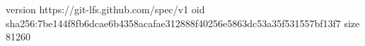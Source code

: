 version https://git-lfs.github.com/spec/v1
oid sha256:7be144f8fb6dcae6b4358acafae312888f40256e5863dc53a35f531557bf13f7
size 81260
